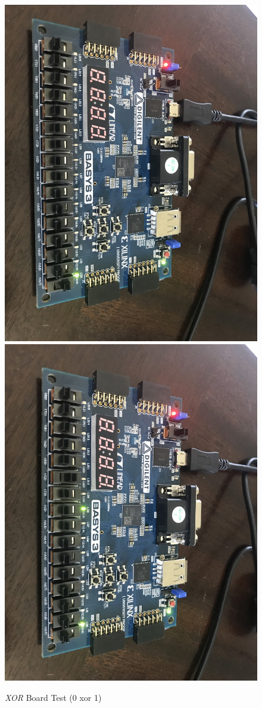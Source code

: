 \documentclass[11pt]{article}
\begin{document}
\begin{figure}[ht]\centering
	\includegraphics[angle=90, width=.8\textwidth]{xor1}
	\includegraphics[angle=90, width=.8\textwidth]{xor2}
	\caption{\textit{XOR} Board Test (0 xor 1)}
	\label{fig:sim_with_table}
\end{figure}
\clearpage
\end{document}
